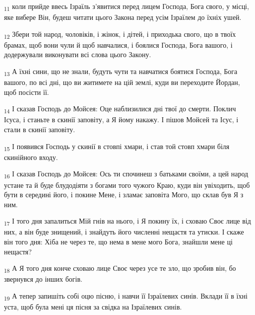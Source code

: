 \begin{tcolorbox}
\textsubscript{11} коли прийде ввесь Ізраїль з'явитися перед лицем Господа, Бога свого, у місці, яке вибере Він, будеш читати цього Закона перед усім Ізраїлем до їхніх ушей.
\end{tcolorbox}
\begin{tcolorbox}
\textsubscript{12} Збери той народ, чоловіків, і жінок, і дітей, і приходька свого, що в твоїх брамах, щоб вони чули й щоб навчалися, і боялися Господа, Бога вашого, і додержували виконувати всі слова цього Закону.
\end{tcolorbox}
\begin{tcolorbox}
\textsubscript{13} А їхні сини, що не знали, будуть чути та навчатися боятися Господа, Бога вашого, по всі дні, що ви житимете на цій землі, куди ви переходите Йордан, щоб посісти її.
\end{tcolorbox}
\begin{tcolorbox}
\textsubscript{14} І сказав Господь до Мойсея: Оце наблизилися дні твої до смерти. Поклич Ісуса, і станьте в скинії заповіту, а Я йому накажу. І пішов Мойсей та Ісус, і стали в скинії заповіту.
\end{tcolorbox}
\begin{tcolorbox}
\textsubscript{15} І появився Господь у скинії в стовпі хмари, і став той стовп хмари біля скинійного входу.
\end{tcolorbox}
\begin{tcolorbox}
\textsubscript{16} І сказав Господь до Мойсея: Ось ти спочинеш з батьками своїми, а цей народ устане та й буде блудодіяти з богами того чужого Краю, куди він увіходить, щоб бути в середині його, і покине Мене, і зламає заповіта Мого, що склав був Я з ним.
\end{tcolorbox}
\begin{tcolorbox}
\textsubscript{17} І того дня запалиться Мій гнів на нього, і Я покину їх, і сховаю Своє лице від них, а він буде знищений, і знайдуть його численні нещастя та утиски. І скаже він того дня: Хіба не через те, що нема в мене мого Бога, знайшли мене ці нещастя?
\end{tcolorbox}
\begin{tcolorbox}
\textsubscript{18} А Я того дня конче сховаю лице Своє через усе те зло, що зробив він, бо звернувся до інших богів.
\end{tcolorbox}
\begin{tcolorbox}
\textsubscript{19} А тепер запишіть собі оцю пісню, і навчи її Ізраїлевих синів. Вклади її в їхні уста, щоб була мені ця пісня за свідка на Ізраїлевих синів.
\end{tcolorbox}
